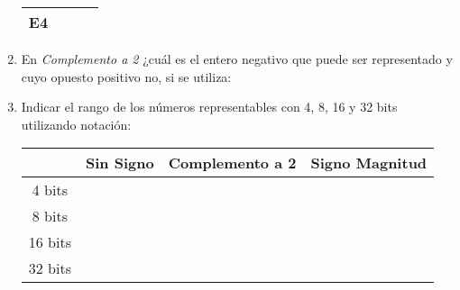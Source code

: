 \documentclass[12pt]{article}
\begin{document}
\begin{enumerate}
\begin{center}
\begin{tabular}[t]{|c|c|c|c|}
            \textbf{E4}&&&\\

            \hline

            \end{tabular}

        \end{center}

    \item En \emph{Complemento a 2} ¿cuál es el entero negativo que puede ser
        representado y cuyo opuesto positivo no, si se utiliza:


    \item Indicar el rango de los números representables con 4, 8, 16 y 32
        bits utilizando notación:

        \begin{center}

            \begin{tabular}[t]{|c|c|c|c|}

            \cline{2-4}

            \multicolumn{1}{c|}{}& \textbf{Sin Signo} &
                \textbf{Complemento a 2} & \textbf{Signo Magnitud}\\

            \hline

                4 bits & \hspace{9em}~ &\hspace{9em}~&\hspace{9em}~\\

            \hline

            8 bits&&&\\

            \hline

            16 bits&&&\\

            \hline

            32 bits&&&\\

            \hline

            \end{tabular}

        \end{center}

\end{enumerate}
\end{document}
